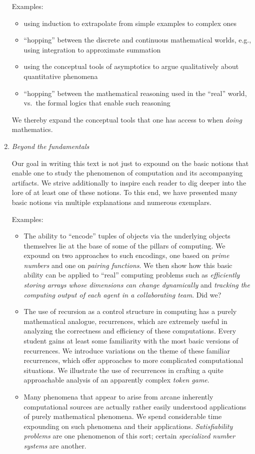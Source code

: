 \begin{enumerate}
\medskip

{\small\sf Examples:}
\begin{itemize}
\item
using induction to extrapolate from simple examples to complex ones
\item
``hopping'' between the discrete and continuous mathematical worlds,
e.g., using integration to approximate summation
\item
using the conceptual tools of asymptotics to argue qualitatively about
quantitative phenomena
\item
``hopping'' between the mathematical reasoning used in the ``real''
  world, vs.~the formal logics that enable such reasoning
\end{itemize}
We thereby expand the conceptual tools that one has access to when
{\em doing} mathematics.

\medskip

\item
{\it Beyond the fundamentals}

Our goal in writing this text is not just to expound on the basic
notions that enable one to study the phenomenon of computation and its
accompanying artifacts.  We strive additionally to inspire each reader
to dig deeper into the lore of at least one of these notions. To this
end, we have presented many basic notions via multiple explanations
and numerous exemplars.

\medskip

{\small\sf Examples:}
\begin{itemize}
\item
The ability to ``encode'' tuples of objects via the underlying objects
themselves lie at the base of some of the pillars of computing.  We
expound on two approaches to such encodings, one based on {\em prime
  numbers} and one on {\em pairing functions}.  We then show how this
basic ability can be applied to ``real'' computing problems such as
{\em efficiently storing arrays whose dimensions can change
  dynamically} and {\em tracking the computing output of each agent in
  a collaborating team}.
  {\Denis Did we?}
\item
The use of recursion as a control structure in computing has a purely
mathematical analogue, recurrences, which are extremely useful in
analyzing the correctness and efficiency of these computations.  Every
student gains at least some familiarity with the most basic versions
of recurrences.  We introduce variations on the theme of these
familiar recurrences, which offer approaches to more complicated
computational situations.  We illustrate the use of recurrences in
crafting a quite approachable analysis of an apparently complex {\em
  token game}.
\item
Many phenomena that appear to arise from arcane inherently
computational sources are actually rather easily understood
applications of purely mathematical phenomena.  We spend considerable
time expounding on such phenomena and their applications.  {\em
  Satisfiability problems} are one phenomenon of this sort; certain
{\em specialized number systems} are another.
\end{itemize}
\end{enumerate}


